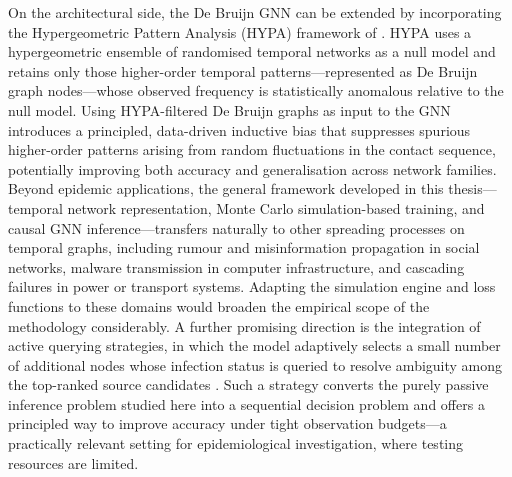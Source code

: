 On the architectural side, the De Bruijn GNN can be extended by incorporating
the Hypergeometric Pattern Analysis (HYPA) framework of
\cite{vonPichowski2024}. HYPA uses a hypergeometric ensemble of randomised
temporal networks as a null model and retains only those higher-order temporal
patterns---represented as De Bruijn graph nodes---whose observed frequency is
statistically anomalous relative to the null model. Using HYPA-filtered De
Bruijn graphs as input to the GNN introduces a principled, data-driven inductive
bias that suppresses spurious higher-order patterns arising from random
fluctuations in the contact sequence, potentially improving both accuracy and
generalisation across network families. Beyond epidemic applications, the
general framework developed in this thesis---temporal network representation,
Monte Carlo simulation-based training, and causal GNN inference---transfers
naturally to other spreading processes on temporal graphs, including rumour
and misinformation propagation in social networks, malware transmission in
computer infrastructure, and cascading failures in power or transport systems.
Adapting the simulation engine and loss functions to these domains would
broaden the empirical scope of the methodology considerably. A further
promising direction is the integration of active querying strategies, in which
the model adaptively selects a small number of additional nodes whose infection
status is queried to resolve ambiguity among the top-ranked source candidates
\cite{Sterchi2025}. Such a strategy converts the purely passive inference
problem studied here into a sequential decision problem and offers a principled
way to improve accuracy under tight observation budgets---a practically relevant
setting for epidemiological investigation, where testing resources are limited.
